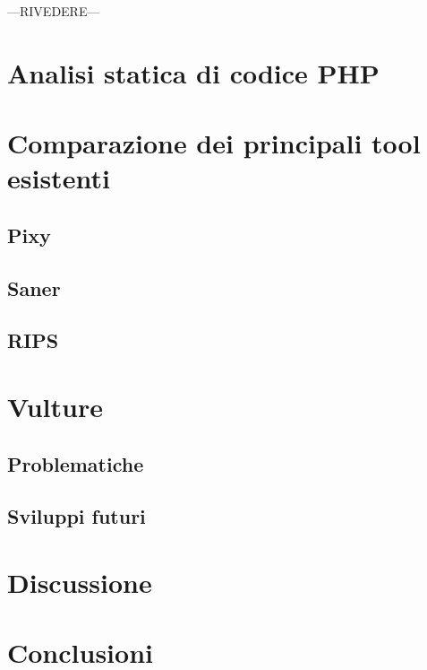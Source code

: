 ---RIVEDERE---

\chapter{Analisi statica di codice PHP}

\chapter{Comparazione dei principali tool esistenti}

\section{Pixy}

\section{Saner}

\section{RIPS}

\chapter{Vulture}

\section{Problematiche}

\section{Sviluppi futuri}

\chapter{Discussione}

\chapter{Conclusioni}